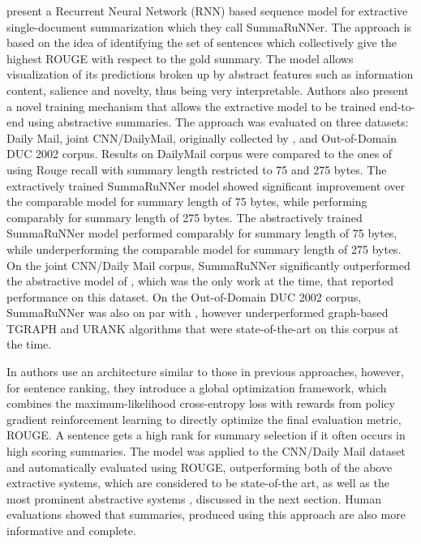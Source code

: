 \documentclass[11pt,a4paper,onecolumn]{article}
\begin{document}
\cite{nallapati2017summarunner} present a Recurrent Neural Network (RNN) based sequence model for extractive single-document summarization  which they call SummaRuNNer.
The approach is based on the idea of identifying the set of sentences which collectively give the highest ROUGE with respect to the gold summary.
The model allows visualization of its predictions broken up by abstract features such as information content, salience and novelty, thus being very interpretable.
Authors also present a novel training mechanism that allows the extractive model to be trained end-to-end using abstractive summaries.
The approach was evaluated on three datasets: Daily Mail, joint CNN/DailyMail, originally collected by \cite{hermann2015teaching}, and Out-of-Domain DUC 2002 corpus.
Results on DailyMail corpus were compared to the ones of \cite{cheng2016neural} using Rouge recall with summary length restricted to 75 and 275 bytes.
The extractively trained SummaRuNNer model showed significant improvement over the comparable model for summary length of 75 bytes, while performing comparably for summary length of 275 bytes.
The abstractively trained SummaRuNNer model performed comparably for summary length of 75 bytes, while underperforming the comparable model for summary length of 275 bytes.
On the joint CNN/Daily Mail corpus, SummaRuNNer significantly outperformed the abstractive model of \cite{nallapati2016abstractive}, which was the only work at the time, that reported performance on this dataset.
On the Out-of-Domain DUC 2002 corpus, SummaRuNNer was also on par with \cite{cheng2016neural}, however underperformed graph-based TGRAPH \cite{parveen2015topical} and URANK \cite{wan2010towards} algorithms that were state-of-the-art on this corpus at the time.

In \cite{narayan2017neural} authors use an architecture similar to those in previous approaches, however, for sentence ranking, they introduce a global optimization framework, which combines the maximum-likelihood cross-entropy loss with rewards from policy gradient reinforcement learning to directly optimize the final evaluation metric, ROUGE.
A sentence gets a high rank for summary selection if it often occurs in high scoring summaries.
The model was applied to the CNN/Daily Mail dataset and automatically evaluated using ROUGE, outperforming both of the above extractive systems, which are considered to be state-of-the art, as well as the most prominent abstractive systems \cite{nallapati2016abstractive, chen2016distraction, see2017get}, discussed in the next section.
Human evaluations showed that summaries, produced using this approach are also more informative and complete.
\end{document}

